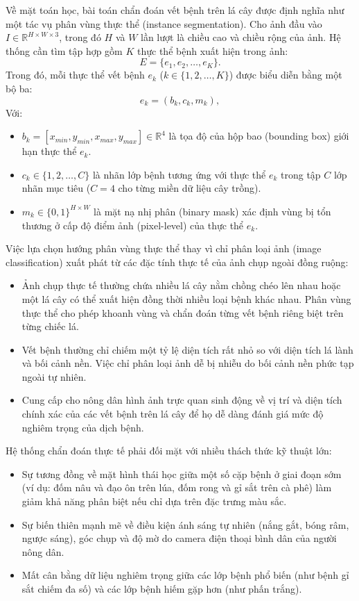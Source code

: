 Về mặt toán học, bài toán chẩn đoán vết bệnh trên lá cây được định nghĩa như một tác vụ phân vùng thực thể (instance segmentation). Cho ảnh đầu vào $I \in \mathbb{R}^{H \times W \times 3}$, trong đó $H$ và $W$ lần lượt là chiều cao và chiều rộng của ảnh. Hệ thống cần tìm tập hợp gồm $K$ thực thể bệnh xuất hiện trong ảnh:
\begin{equation}
E = \{e_1, e_2, \dots, e_K\}.
\end{equation}
Trong đó, mỗi thực thể vết bệnh $e_k$ ($k \in \{1, 2, \dots, K\}$) được biểu diễn bằng một bộ ba:
\begin{equation}
e_k = (b_k, c_k, m_k),
\end{equation}
Với:
\begin{itemize}
  \item $b_k = [x_{min}, y_{min}, x_{max}, y_{max}] \in \mathbb{R}^4$ là tọa độ của hộp bao (bounding box) giới hạn thực thể $e_k$.
  \item $c_k \in \{1, 2, \dots, C\}$ là nhãn lớp bệnh tương ứng với thực thể $e_k$ trong tập $C$ lớp nhãn mục tiêu ($C = 4$ cho từng miền dữ liệu cây trồng).
  \item $m_k \in \{0, 1\}^{H \times W}$ là mặt nạ nhị phân (binary mask) xác định vùng bị tổn thương ở cấp độ điểm ảnh (pixel-level) của thực thể $e_k$.
\end{itemize}

Việc lựa chọn hướng phân vùng thực thể thay vì chỉ phân loại ảnh (image classification) xuất phát từ các đặc tính thực tế của ảnh chụp ngoài đồng ruộng:
\begin{itemize}
  \item Ảnh chụp thực tế thường chứa nhiều lá cây nằm chồng chéo lên nhau hoặc một lá cây có thể xuất hiện đồng thời nhiều loại bệnh khác nhau. Phân vùng thực thể cho phép khoanh vùng và chẩn đoán từng vết bệnh riêng biệt trên từng chiếc lá.
  \item Vết bệnh thường chỉ chiếm một tỷ lệ diện tích rất nhỏ so với diện tích lá lành và bối cảnh nền. Việc chỉ phân loại ảnh dễ bị nhiễu do bối cảnh nền phức tạp ngoài tự nhiên.
  \item Cung cấp cho nông dân hình ảnh trực quan sinh động về vị trí và diện tích chính xác của các vết bệnh trên lá cây để họ dễ dàng đánh giá mức độ nghiêm trọng của dịch bệnh.
\end{itemize}

Hệ thống chẩn đoán thực tế phải đối mặt với nhiều thách thức kỹ thuật lớn:
\begin{itemize}
  \item Sự tương đồng về mặt hình thái học giữa một số cặp bệnh ở giai đoạn sớm (ví dụ: đốm nâu và đạo ôn trên lúa, đốm rong và gỉ sắt trên cà phê) làm giảm khả năng phân biệt nếu chỉ dựa trên đặc trưng màu sắc.
  \item Sự biến thiên mạnh mẽ về điều kiện ánh sáng tự nhiên (nắng gắt, bóng râm, ngược sáng), góc chụp và độ mờ do camera điện thoại bình dân của người nông dân.
  \item Mất cân bằng dữ liệu nghiêm trọng giữa các lớp bệnh phổ biến (như bệnh gỉ sắt chiếm đa số) và các lớp bệnh hiếm gặp hơn (như phấn trắng).
\end{itemize}

